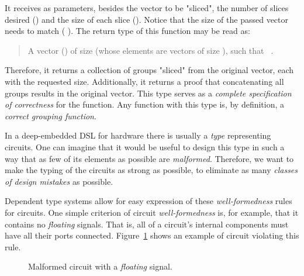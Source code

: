     \begin{center}
    \end{center}

    It receives as parameters, besides the vector to be "sliced",
    the number of slices desired () and the size of each slice ().
    Notice that the size of the passed vector needs to match ( \AF{*} ).
    The return type of this function may be read as:

    \begin{quote}
        A vector () of size  (whose elements are vectors of size ),
        such that \texttt{   }.
    \end{quote}

    Therefore, it returns a collection of groups "sliced" from the original vector, each with the requested size.
    Additionally, it returns a proof that concatenating all groups results in the original vector.
    This type serves as a \emph{complete specification of correctness} for the function.
    Any function with this type is, by definition, a \emph{correct grouping function}.

    In a deep-embedded \acs{DSL} for hardware there is usually a \emph{type} representing circuits.
    One can imagine that it would be useful to design this type
    in such a way that as few of its elements as possible are \emph{malformed}.
    Therefore, we want to make the typing of the circuits as strong as possible,
    to eliminate as many \emph{classes of design mistakes} as possible.

    Dependent type systems allow for easy expression of these \emph{well-formedness} rules for circuits.
    One simple criterion of circuit \emph{well-formedness} is, for example, that it contains no \emph{floating} signals.
    That is, all of a circuit's internal components must have all their ports connected.
    Figure~\ref{fig:floating-wire} shows an example of circuit violating this rule.

    \begin{figure}[h]
        \caption{Malformed circuit with a \emph{floating} signal. \label{fig:floating-wire}}
    \end{figure}

